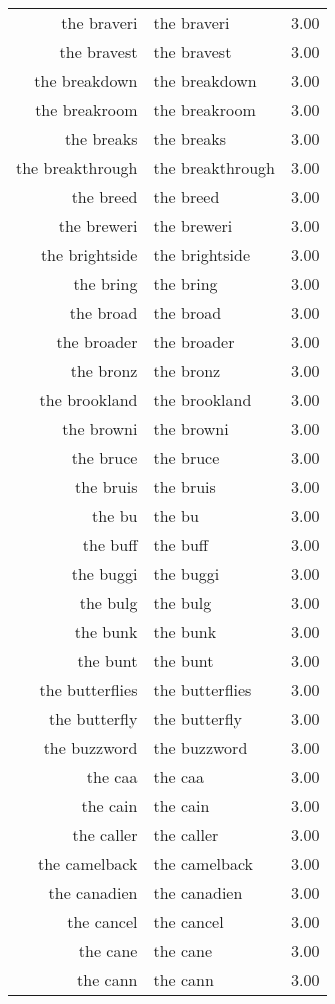 \begin{table}[ht]
\begin{tabular}{rlr}
  the braveri & the braveri & 3.00 \\ 
  the bravest & the bravest & 3.00 \\ 
  the breakdown & the breakdown & 3.00 \\ 
  the breakroom & the breakroom & 3.00 \\ 
  the breaks & the breaks & 3.00 \\ 
  the breakthrough & the breakthrough & 3.00 \\ 
  the breed & the breed & 3.00 \\ 
  the breweri & the breweri & 3.00 \\ 
  the brightside & the brightside & 3.00 \\ 
  the bring & the bring & 3.00 \\ 
  the broad & the broad & 3.00 \\ 
  the broader & the broader & 3.00 \\ 
  the bronz & the bronz & 3.00 \\ 
  the brookland & the brookland & 3.00 \\ 
  the browni & the browni & 3.00 \\ 
  the bruce & the bruce & 3.00 \\ 
  the bruis & the bruis & 3.00 \\ 
  the bu & the bu & 3.00 \\ 
  the buff & the buff & 3.00 \\ 
  the buggi & the buggi & 3.00 \\ 
  the bulg & the bulg & 3.00 \\ 
  the bunk & the bunk & 3.00 \\ 
  the bunt & the bunt & 3.00 \\ 
  the butterflies & the butterflies & 3.00 \\ 
  the butterfly & the butterfly & 3.00 \\ 
  the buzzword & the buzzword & 3.00 \\ 
  the caa & the caa & 3.00 \\ 
  the cain & the cain & 3.00 \\ 
  the caller & the caller & 3.00 \\ 
  the camelback & the camelback & 3.00 \\ 
  the canadien & the canadien & 3.00 \\ 
  the cancel & the cancel & 3.00 \\ 
  the cane & the cane & 3.00 \\ 
  the cann & the cann & 3.00 \\ 

\end{tabular}
\end{table}
